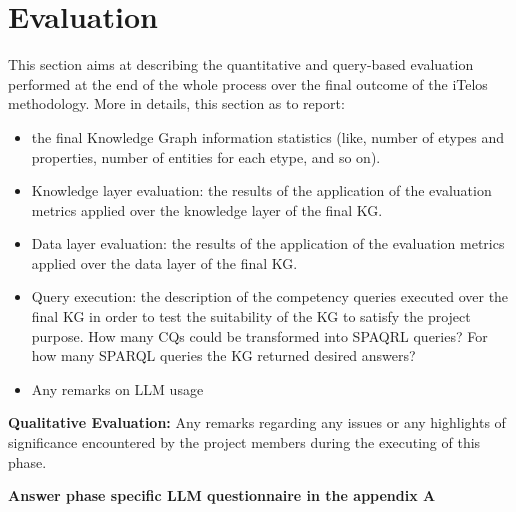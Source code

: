 \section{Evaluation}

This section aims at describing the quantitative and query-based evaluation performed at the end of the whole process over the final outcome of the iTelos methodology. More in details, this section as to report:

\begin{itemize}
    \item the final Knowledge Graph information statistics (like, number of etypes and properties, number of entities for each etype, and so on).
    \item Knowledge layer evaluation: the results of the application of the evaluation metrics applied over the knowledge layer of the final KG.
    \item Data layer evaluation: the results of the application of the evaluation metrics applied over the data layer of the final KG.
    \item Query execution: the description of the competency queries executed over the final KG in order to test the suitability of the KG to satisfy the project purpose. How many CQs could be transformed into SPAQRL queries? For how many SPARQL queries the KG returned desired answers?
    \item Any remarks on LLM usage
\end{itemize}

\noindent \textbf{Qualitative Evaluation:} Any remarks regarding any issues or any highlights of significance encountered by the project members during the executing of this phase.

\noindent \textbf{Answer phase specific LLM questionnaire in the appendix A}
